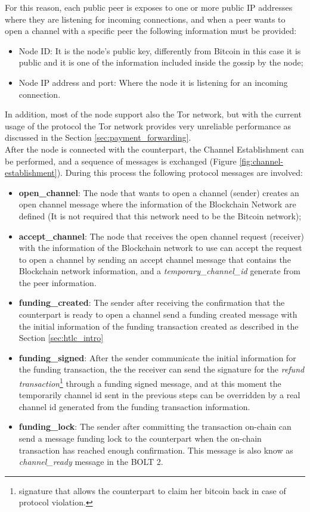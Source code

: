 For this reason, each public peer is exposes to one or more public IP addresses where
they are listening for incoming connections, and when a peer wants to open
a channel with a specific peer the following information must be provided:

\begin{itemize}
  \item Node ID: It is the node's public key, differently from Bitcoin in this case it is public and it is one of the information included inside the gossip by the node;
  \item Node IP address and port: Where the node it is listening for an incoming connection.
\end{itemize}

In addition, most of the node support also the Tor network, but with the current usage of the protocol the Tor network provides very unreliable
performance as discussed in the Section \ref{sec:payment_forwarding}.\\
After the node is connected with the counterpart, the Channel Establishment can be performed, and a sequence
of messages is exchanged (Figure \ref{fig:channel-establishment}). During this process
the following protocol messages are involved:

\begin{itemize}
  \item {\bf open\_channel}: The node that wants to open a channel (sender) creates an open channel message where the information of the
        Blockchain Network are defined (It is not required that this network need to be the Bitcoin network);
  \item {\bf accept\_channel}: The node that receives the open channel request (receiver) with the information of the Blockchain network to use
        can accept the request to open a channel by sending an accept channel message that contains the Blockchain network information, and
        a \emph{temporary\_channel\_id} generate from the peer information.
  \item {\bf funding\_created}: The sender after receiving the confirmation that the counterpart is ready to open a channel
        send a funding created message with the initial information of the funding transaction created as described in the Section \ref{sec:htlc_intro}
  \item {\bf funding\_signed}: After the sender communicate the initial information for the funding transaction, the
        the receiver can send the signature for the \emph{refund transaction}\footnote{signature that allows the counterpart to claim her bitcoin back in case of protocol violation.} through a funding signed message, and at this moment the temporarily
        channel id sent in the previous steps can be overridden by a real channel id generated from the funding transaction information.
  \item {\bf funding\_lock}: The sender after committing the transaction on-chain can send a message funding lock to the counterpart when
        the on-chain transaction has reached enough confirmation. This message is also know as \emph{channel\_ready} message in the BOLT 2\cite{bolt2}.
\end{itemize}

